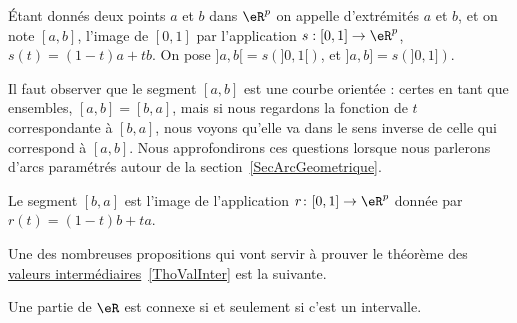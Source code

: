 \begin{definition}      \label{DefLISOooDHLQrl}
	Étant donnés deux points $a$ et $b$ dans $\eR^p$ on appelle  d'extrémités $a$ et $b$, et on note $[a,b]$, l'image de $[0,1]$ par l'application $s: [0,1]\to \eR^p$, $s(t)= (1-t)a+tb$.  On pose $]a,b[=s\left(]0,1[\right)$, et  $]a,b]=s\left(]0,1]\right)$.
\end{definition}
Il faut observer que le segment $[a,b]$ est une courbe orientée : certes en tant que ensembles, $[a,b]=[b,a]$, mais si nous regardons la fonction de $t$ correspondante à $[b,a]$, nous voyons qu'elle va dans le sens inverse de celle qui correspond à $[a,b]$. Nous approfondirons ces questions lorsque nous parlerons d'arcs paramétrés autour de la section~\ref{SecArcGeometrique}.

Le segment $[b,a]$ est l'image de l'application $r\colon [0,1]\to \eR^p$ donnée par $r(t)=(1-t)b+ta$.

Une des nombreuses propositions qui vont servir à prouver le théorème des \href{http://fr.wikipedia.org/wiki/Théorème_des_valeurs_intermédiaires}{valeurs intermédiaires}~\ref{ThoValInter} est la suivante.
\begin{proposition} \label{PropInterssiConn}
    Une partie de $\eR$ est connexe si et seulement si c'est un intervalle.
\end{proposition}

